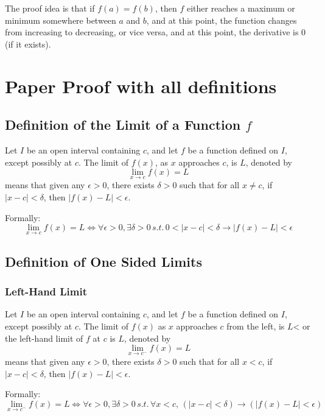 \documentclass[12pt]{article}
\begin{document}
The proof idea is that if $f(a) = f(b)$, then $f$ either reaches a maximum or minimum somewhere between $a$ and $b$, and at this point, the function changes from increasing to decreasing, or vice versa, and at this point, the derivative is 0 (if it exists). %

\section{Paper Proof with all definitions}

\subsection{Definition of the Limit of a Function $f$}

Let $I$ be an open interval containing $c$, and let $f$ be a function defined on $I$, except possibly at $c$. The limit of $f(x)$, as $x$ approaches $c$, is $L$, denoted by $$\lim_{x \rightarrow c} f(x) = L$$ means that given any $\epsilon > 0$, there exists $\delta > 0$ such that for all $x \neq c$, if $|x - c| < \delta$, then $|f(x) - L | < \epsilon$. 

Formally: $$\lim_{x \rightarrow c} f(x) = L \Longleftrightarrow \forall \epsilon > 0, \exists \delta > 0 \, s.t. \, 0 < |x - c | < \delta \rightarrow |f(x) - L| < \epsilon$$

\subsection{Definition of One Sided Limits}

\subsubsection{Left-Hand Limit}
Let $I$ be an open interval containing $c$, and let $f$ be a function defined on $I$, except possibly at $c$. The limit of $f(x)$ as $x$ approaches $c$ from the left, is $L$< or the left-hand limit of $f$ at $c$ is $L$, denoted by $$\lim_{x \rightarrow c^-}f(x) = L$$ means that given any $\epsilon > 0$, there exists $\delta > 0$ such that for all $x < c$, if $|x-c| < \delta$, then $|f(x) - L| < \epsilon$. 

Formally: $$\lim_{x \rightarrow c^-}f(x) = L \Longleftrightarrow \forall \epsilon > 0, \exists \delta > 0 \, s.t. \, \forall x < c, \, (|x-c| < \delta) \rightarrow (|f(x)-L| < \epsilon)$$
\end{document}
